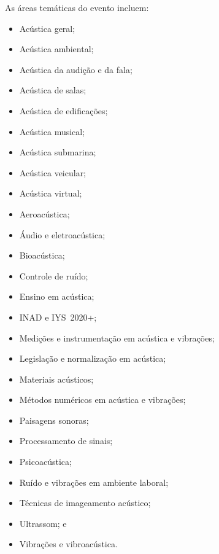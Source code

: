 \documentclass[12pt, a4paper, twoside, twocolumn]{article}
\begin{document}
As áreas temáticas do evento incluem:
%	
\begin{itemize}[noitemsep,topsep=-1ex] \itemsep=1.0pt
\item[\textbullet] Acústica geral; 
\item[\textbullet] Acústica ambiental;
\item[\textbullet] Acústica da audição e da fala;
\item[\textbullet] Acústica de salas;
\item[\textbullet] Acústica de edificações;
\item[\textbullet] Acústica musical;
\item[\textbullet] Acústica submarina;
\item[\textbullet] Acústica veicular;
\item[\textbullet] Acústica virtual;
\item[\textbullet] Aeroacústica;
\item[\textbullet] Áudio e eletroacústica;
\item[\textbullet] Bioacústica;
\item[\textbullet] Controle de ruído;
\item[\textbullet] Ensino em acústica;
\item[\textbullet] INAD e IYS~2020+;
\item[\textbullet] Medições e instrumentação em acústica e vibrações;
\item[\textbullet] Legislação e normalização em acústica;
\item[\textbullet] Materiais acústicos;
\item[\textbullet] Métodos numéricos em acústica e vibrações;
\item[\textbullet] Paisagens sonoras;
\item[\textbullet] Processamento de sinais;
\item[\textbullet] Psicoacústica;
\item[\textbullet] Ruído e vibrações em ambiente laboral;
\item[\textbullet] Técnicas de imageamento acústico;
\item[\textbullet] Ultrassom; e
\item[\textbullet] Vibrações e vibroacústica.
\end{itemize}
	

\end{document}
